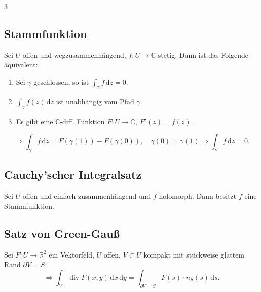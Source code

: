 \documentclass[a4paper,landscape]{article}
\newcommand{\C}{\mathbb C}
\newcommand{\R}{\mathbb R}
\newcommand{\dd}{\,\mathrm d}
\DeclareMathOperator{\diverg}{div}
\begin{document}
\begin{multicols*}{3}
\subsection*{Stammfunktion}
Sei $U$ offen und wegzusammenhängend, $f:U\to\C$ stetig. Dann ist das Folgende äquivalent:
\begin{enumerate}[label=(\roman*)]
\item Sei $\gamma$ geschlossen, so ist $\displaystyle\int_\gamma f\dd z=0$.
\item $\displaystyle\int_\gamma f(z)\dd z$ ist unabhängig vom Pfad $\gamma$.
\item Es gibt eine $\C$-diff. Funktion $F:U\to\C$, $F'(z)=f(z)$.
\end{enumerate}
\[
\Rightarrow \int_\gamma f\dd z=F(\gamma(1))-F(\gamma(0)),
\quad \gamma(0)=\gamma(1)\Rightarrow \int_\gamma f\dd z=0.
\]

\subsection*{Cauchy'scher Integralsatz}
Sei $U$ offen und einfach zusammenhängend und $f$ holomorph. Dann besitzt $f$ eine Stammfunktion.

\subsection*{Satz von Green-Gauß}
Sei $F:U\to\R^2$ ein Vektorfeld, $U$ offen, $V\subset U$ kompakt mit stückweise glattem Rand $\partial V=S$:
\[
\Rightarrow \int_V \diverg F(x,y)\dd x\dd y=\int_{\partial V=S} F(s)\cdot n_S(s)\dd s.
\]


\end{multicols*}
\end{document}
